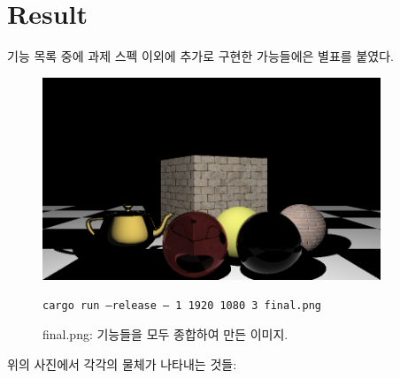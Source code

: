 \documentclass[11pt, a4paper]{article}
\begin{document}
\section{Result}

기능 목록 중에 과제 스펙 이외에 추가로 구현한 가능들에은 별표를 붙였다.

\begin{figure}[H]
  \centering
  \includegraphics[width=0.9\textwidth]{final.png}
  \caption{final.png: 기능들을 모두 종합하여 만든 이미지.}
  \texttt{cargo run --release -- 1 1920 1080 3 final.png}
\end{figure}

위의 사진에서 각각의 물체가 나타내는 것들:
\end{document}
